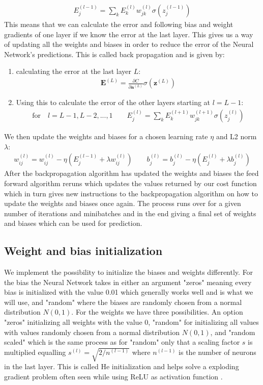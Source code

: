 \documentclass[11pt]{article}
\begin{document}
\begin{align*}
    E^{(l-1)}_j = \sum_k E^{(l)}_k w_{jk}^{(l)}\sigma(z_j^{(l-1)})
\end{align*}
This means that we can calculate the error and following bias and weight gradients of one layer if we know the error at the last layer. This gives us a way of updating all the weights and biases in order to reduce the error of the Neural Network's predictions. This is called back propagation and is given by:
\begin{enumerate}
    \item calculating the error at the last layer $L$:
          \begin{align*}
              \boldsymbol{E}^{(L)} = \frac{\partial C }{\partial \boldsymbol{a}^{(L)}} \sigma(\boldsymbol{z}^{(L)})
          \end{align*}
    \item Using this to calculate the error of the other layers starting at $l=L-1$:
          \begin{align*}
              \text{for}\quad  l=L-1, L-2,...,1 \quad\quad
              E_j^{(l)} = \sum_k E^{(l+1)}_k w_{jk}^{(l+1)} \sigma(z_j^{(l)})
          \end{align*}
\end{enumerate}
We then update the weights and biases for a chosen learning rate $\eta$ and L2 norm $\lambda$:
\begin{align*}
    w^{(l)}_{ij} = w^{(l)}_{ij} - \eta(E_j^{(l-1)}  + \lambda w_{ij}^{(l)}) \quad\quad b_j^{(l)} = b_j^{(l)} - \eta(E_j^{(l)} + \lambda b_j^{(l)})
\end{align*}
After the backpropagation algorithm has updated the weights and biases the feed forward algorithm reruns which updates the values returned by our cost function which in turn gives new instructions to the backpropagation algorithm on how to update the weights and biases once again. The process runs over for a given number of iterations and minibatches and in the end giving a final set of weights and biases which can be used for prediction.

\subsection{Weight and bias initialization}
We implement the possibility to initialize the biases and weights differently. For the bias the Neural Network takes in either an argument "zeros" meaning every bias is initialized with the value 0.01 which generally works well  \cite{bias} and is what we will use, and "random" where the biases are randomly chosen from a normal distribution $N(0,1)$. For the weights we have three possibilities. An option "zeros" initializing all weights with the value 0, "random" for initializing all values with values randomly chosen from a normal distribution $N(0,1)$, and "random scaled" which is the same process as for "random" only that a scaling factor $s$ is multiplied equalling $s^{(l)}=\sqrt{2/n^{(l-1)}}$ where $n^{(l-1)}$ is the number of neurons in the last layer. This is called He initialization and helps solve a exploding gradient problem often seen while using ReLU as activation function \cite{he}\cite{he_2}.
\end{document}

